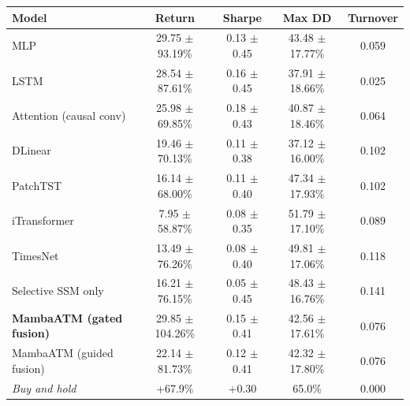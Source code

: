 {\footnotesize
\setlength{\tabcolsep}{3pt}
\begin{tabular}{lcccc}
\toprule
\textbf{Model} & \textbf{Return} & \textbf{Sharpe} & \textbf{Max DD} & \textbf{Turnover} \\
\midrule
MLP & 29.75 $\pm$ 93.19\% & 0.13 $\pm$ 0.45 & 43.48 $\pm$ 17.77\% & 0.059 \\
LSTM & 28.54 $\pm$ 87.61\% & 0.16 $\pm$ 0.45 & 37.91 $\pm$ 18.66\% & 0.025 \\
Attention (causal conv) & 25.98 $\pm$ 69.85\% & 0.18 $\pm$ 0.43 & 40.87 $\pm$ 18.46\% & 0.064 \\
DLinear & 19.46 $\pm$ 70.13\% & 0.11 $\pm$ 0.38 & 37.12 $\pm$ 16.00\% & 0.102 \\
PatchTST & 16.14 $\pm$ 68.00\% & 0.11 $\pm$ 0.40 & 47.34 $\pm$ 17.93\% & 0.102 \\
iTransformer & 7.95 $\pm$ 58.87\% & 0.08 $\pm$ 0.35 & 51.79 $\pm$ 17.10\% & 0.089 \\
TimesNet & 13.49 $\pm$ 76.26\% & 0.08 $\pm$ 0.40 & 49.81 $\pm$ 17.06\% & 0.118 \\
Selective SSM only & 16.21 $\pm$ 76.15\% & 0.05 $\pm$ 0.45 & 48.43 $\pm$ 16.76\% & 0.141 \\
\textbf{MambaATM (gated fusion)} & 29.85 $\pm$ 104.26\% & 0.15 $\pm$ 0.41 & 42.56 $\pm$ 17.61\% & 0.076 \\
MambaATM (guided fusion) & 22.14 $\pm$ 81.73\% & 0.12 $\pm$ 0.41 & 42.32 $\pm$ 17.80\% & 0.076 \\
\midrule
\emph{Buy and hold} & +67.9\% & +0.30 & 65.0\% & 0.000 \\
\bottomrule
\end{tabular}
}

